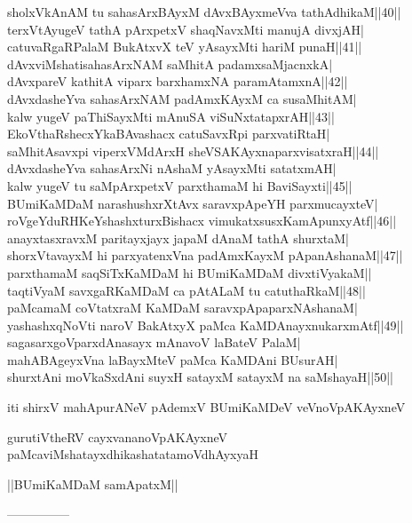\documentclass{article}
\begin{document}
sholxVkAnAM tu sahasArxBAyxM dAvxBAyxmeVva tathAdhikaM||40||\\
terxVtAyugeV tathA pArxpetxV shaqNavxMti manujA divxjAH|\\
catuvaRgaRPalaM BukAtxvX teV yAsayxMti hariM punaH||41||\\
dAvxviMshatisahasArxNAM saMhitA padamxsaMjacnxkA|\\
dAvxpareV kathitA viparx barxhamxNA paramAtamxnA||42||\\
dAvxdasheYva sahasArxNAM padAmxKAyxM ca susaMhitAM|\\
kalw yugeV paThiSayxMti mAnuSA viSuNxtatapxrAH||43||\\
EkoVthaRshecxYkaBAvashacx catuSavxRpi parxvatiRtaH|\\
saMhitAsavxpi viperxVMdArxH sheVSAKAyxnaparxvisatxraH||44||\\
dAvxdasheYva sahasArxNi nAshaM yAsayxMti satatxmAH|\\
kalw yugeV tu saMpArxpetxV parxthamaM hi BaviSayxti||45||\\
BUmiKaMDaM narashushxrXtAvx saravxpApeYH parxmucayxteV|\\
roVgeYduRHKeYshashxturxBishacx vimukatxsusxKamApunxyAtf||46||\\
anayxtasxravxM paritayxjayx japaM dAnaM tathA shurxtaM|\\
shorxVtavayxM hi parxyatenxVna padAmxKayxM pApanAshanaM||47||\\
parxthamaM saqSiTxKaMDaM hi BUmiKaMDaM divxtiVyakaM||\\
taqtiVyaM savxgaRKaMDaM ca pAtALaM tu catuthaRkaM||48||\\
paMcamaM coVtatxraM KaMDaM saravxpApaparxNAshanaM|\\
yashashxqNoVti naroV BakAtxyX paMca KaMDAnayxnukarxmAtf||49||\\
sagasarxgoVparxdAnasayx mAnavoV laBateV PalaM|\\
mahABAgeyxVna laBayxMteV paMca KaMDAni BUsurAH|\\
shurxtAni moVkaSxdAni suyxH satayxM satayxM na saMshayaH||50||

\begin{center}
iti shirxV mahApurANeV pAdemxV BUmiKaMDeV veVnoVpAKAyxneV
\end{center}

\begin{center}
gurutiVtheRV cayxvananoVpAKAyxneV paMcaviMshatayxdhikashatatamoVdhAyxyaH
\end{center}

\begin{center}
||BUmiKaMDaM samApatxM||
\end{center}

\begin{center}
---------------
\end{center}
\end{document}

